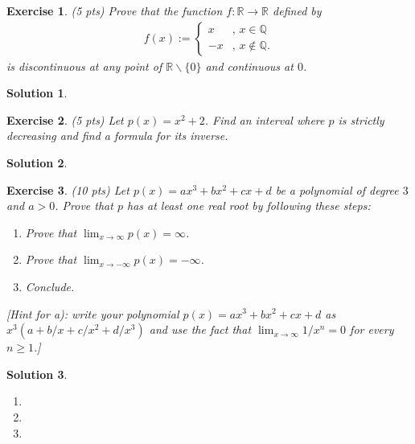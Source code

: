 \documentclass[12pt]{article}
\newcommand{\bR}{\mathbb{R}}
\newcommand{\bQ}{\mathbb{Q}}
\newcommand{\ra}{\rightarrow}
\theoremstyle{plain}
\newtheorem{exer}{\textbf{Exercise}}}
\theoremstyle{plain}
\newtheorem*{sol}{\textbf{Solution}}}
\begin{document}
\begin{exer}
(5 pts)
Prove that the function $f : \bR \ra \bR$ defined by
	\begin{align*}
	f(x) := \begin{cases}
	x & \text{, } x \in \bQ \\
	-x &  \text{, } x \not\in \bQ .
	\end{cases}
	\end{align*}
is discontinuous at any point of $\bR \backslash \{ 0 \}$ and continuous at $0$.
\end{exer}
\begin{sol}

\end{sol}

\begin{exer}
(5 pts)
Let $p(x) = x^2 + 2$. Find an interval where $p$ is strictly decreasing and find a formula for its inverse.
\end{exer}
\begin{sol}

\end{sol}

\begin{exer}
(10 pts)
Let $p(x) = ax^3 + bx^2 + cx + d$ be a polynomial of degree $3$ and $a > 0$. Prove that $p$ has at least one real root by following these steps:
	\begin{enumerate}[label=\textbf{\alph*)}]
	\item Prove that $\lim_{x \ra \infty} p(x) = \infty$.
	\item Prove that $\lim_{x \ra -\infty} p (x) = -\infty$.
	\item Conclude.
	\end{enumerate}
[Hint for a): write your polynomial $p(x) = ax^3 + bx^2 + cx + d$ as $x^3 (a + b/x + c/x^2 + d/x^3)$ and use the fact that $\lim_{x \ra \infty} 1/x^n = 0$ for every $n \geq 1$.]
\end{exer}
\begin{sol}
\begin{enumerate}[label=\textbf{\alph*)}]
\item 
\item 
\item
\end{enumerate}
\end{sol}
\end{document}
